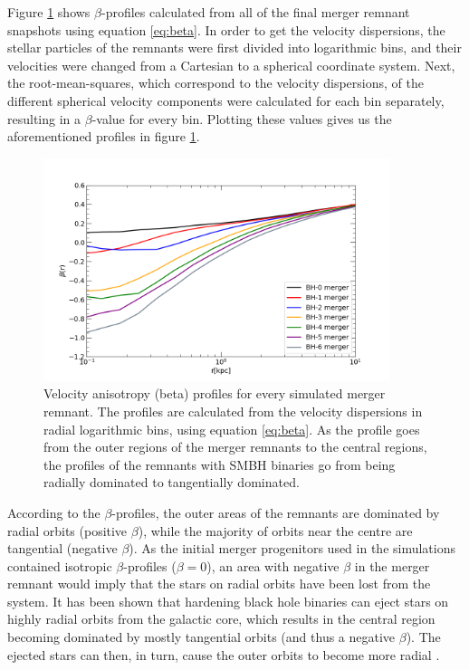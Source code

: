 \documentclass[english, oneside]{HYgradu}
\begin{document}
Figure \ref{figure:beta_no_rb} shows $\beta$-profiles calculated from all of the final merger remnant snapshots using equation \ref{eq:beta}. In order to get the velocity dispersions, the stellar particles of the remnants were first divided into logarithmic bins, and their velocities were changed from a Cartesian to a spherical coordinate system. Next, the root-mean-squares, which correspond to the velocity dispersions, of the different spherical velocity components were calculated for each bin separately, resulting in a $\beta$-value for every bin. Plotting these values gives us the aforementioned profiles in figure \ref{figure:beta_no_rb}. 

\begin{figure}[h]
	\centering
	\includegraphics[width=0.9\textwidth]{beta_no_rb.png}
	\caption{Velocity anisotropy (beta) profiles for every simulated merger remnant. The profiles are calculated from the velocity dispersions in radial logarithmic bins, using equation \ref{eq:beta}. As the profile goes from the outer regions of the merger remnants to the central regions, the profiles of the remnants with SMBH binaries go from being radially dominated to tangentially dominated.}
	\label{figure:beta_no_rb}
\end{figure}

According to the $\beta$-profiles, the outer areas of the remnants are dominated by radial orbits (positive $\beta$), while the majority of orbits near the centre are tangential (negative $\beta$). As the initial merger progenitors used in the simulations contained isotropic $\beta$-profiles ($\beta = 0$), an area with negative $\beta$ in the merger remnant would imply that the stars on radial orbits have been lost from the system. It has been shown that hardening black hole binaries can eject stars on highly radial orbits from the galactic core, which results in the central region becoming dominated by mostly tangential orbits (and thus a negative $\beta$). The ejected stars can then, in turn, cause the outer orbits to become more radial \citep{Quinlan1997, Milosavljevic2001, Thomas2014}. 
\end{document}
